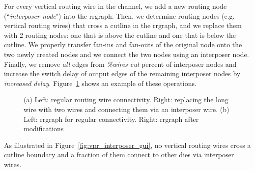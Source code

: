 \documentclass{sig-alternate-2013}
\begin{document}
For every vertical routing wire in the channel, we add a new routing node (``\textit{interposer node}") into the rrgraph. Then, we determine routing nodes (e.g. vertical routing wires) that cross a cutline in the rrgraph, and we replace them with 2 routing nodes: one that is above the cutline and one that is below the cutline. We properly transfer fan-ins and fan-outs of the original node onto the two newly created nodes and we connect the two nodes using an interposer node. Finally, we remove \textit{all} edges from \textit{\%wires cut} percent of interposer nodes and increase the switch delay of output edges of the remaining interposer nodes by \textit{increased delay}. Figure~\ref{fig:rrgraph_ops} shows an example of these operations.


\begin{figure}[!t]
\hfill
{}
\hfill
{}
\hfill
\caption{(a) Left: regular routing wire connectivity. Right: replacing the long wire with two wires and connecting them via an interposer wire. (b) Left: rrgraph for regular connectivity. Right: rrgraph after modifications}
\label{fig:rrgraph_ops}
\end{figure}

As illustrated in Figure~\ref{fig:vpr_interposer_gui}, no vertical routing wires cross a cutline boundary and a fraction of them connect to other dies via interposer wires.
\end{document}
